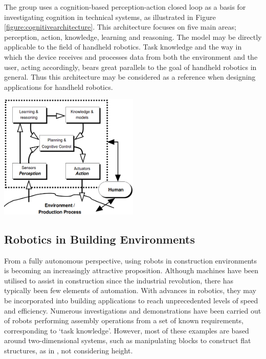 \documentclass[11pt]{article}
\begin{document}
The group uses a cognition-based perception-action closed loop as a basis for investigating cognition in technical systems, as illustrated in Figure \ref{figure:cognitivearchitecture}. This architecture focuses on five main areas; perception, action, knowledge, learning and reasoning. The model may be directly applicable to the field of handheld robotics. Task knowledge and the way in which the device receives and processes data from both the environment and the user, acting accordingly, bears great parallels to the goal of handheld robotics in general. Thus this architecture may be considered as a reference when designing applications for handheld robotics. 

\begin{center}
\includegraphics[width = 0.5\textwidth]{cognitivearchitecture.png}
\label{figure:cognitivearchitecture}
\end{center}

\pagebreak














\subsection{Robotics in Building Environments} \label{building}

From a fully autonomous perspective, using robots in construction environments is becoming an increasingly attractive proposition. Although machines have been utilised to assist in construction since the industrial revolution, there has typically been few elements of automation. With advances in robotics, they may be incorporated into building applications to reach unprecedented levels of speed and efficiency. Numerous investigations and demonstrations have been carried out of robots performing assembly operations from a set of known requirements, corresponding to `task knowledge'. However, most of these examples are based around two-dimensional systems, such as manipulating blocks to construct flat structures, as in \cite{werfel2006}, not considering height.
\end{document}
